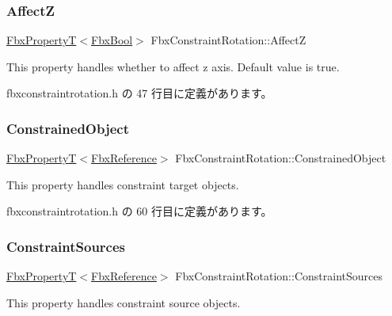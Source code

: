 \subsubsection{\texorpdfstring{AffectZ}{AffectZ}}
{\footnotesize\ttfamily \hyperlink{class_fbx_property_t}{Fbx\+PropertyT}$<$\hyperlink{fbxtypes_8h_a92e0562b2fe33e76a242f498b362262e}{Fbx\+Bool}$>$ Fbx\+Constraint\+Rotation\+::\+AffectZ}

This property handles whether to affect z axis. Default value is true. 

 fbxconstraintrotation.\+h の 47 行目に定義があります。

\mbox{\label{class_fbx_constraint_rotation_aee0715edab2a99b52a40f35aba1d662c}} 
\subsubsection{\texorpdfstring{Constrained\+Object}{ConstrainedObject}}
{\footnotesize\ttfamily \hyperlink{class_fbx_property_t}{Fbx\+PropertyT}$<$\hyperlink{fbxtypes_8h_a44df6a2eec915cf27cd481e5c5e48a24}{Fbx\+Reference}$>$ Fbx\+Constraint\+Rotation\+::\+Constrained\+Object}

This property handles constraint target objects. 

 fbxconstraintrotation.\+h の 60 行目に定義があります。

\mbox{\label{class_fbx_constraint_rotation_ac9bb2a7227a6034425e06395a03d57a6}} 
\subsubsection{\texorpdfstring{Constraint\+Sources}{ConstraintSources}}
{\footnotesize\ttfamily \hyperlink{class_fbx_property_t}{Fbx\+PropertyT}$<$\hyperlink{fbxtypes_8h_a44df6a2eec915cf27cd481e5c5e48a24}{Fbx\+Reference}$>$ Fbx\+Constraint\+Rotation\+::\+Constraint\+Sources}

This property handles constraint source objects. 

